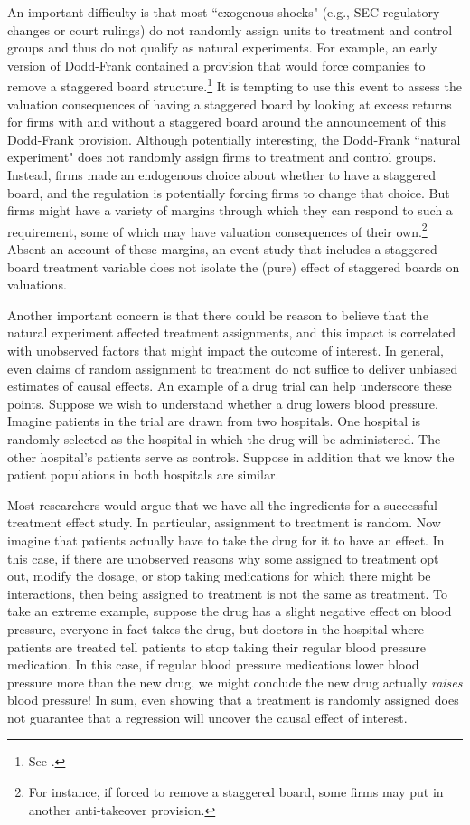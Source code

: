 \documentclass[12pt,reqno,titlepage]{amsart}
\theoremstyle{definition}
\begin{document}
\begin{doublespace}
An important difficulty is that most ``exogenous shocks" (e.g., SEC regulatory changes or court rulings) do not randomly assign 
units to treatment and control groups and thus do not qualify as natural experiments.
For example, an early version of Dodd-Frank contained a provision that would force companies to remove a staggered board structure.\footnote{See \citet{Larcker:2011hs}.}
It is tempting to use this event to assess the valuation consequences of having a staggered board by looking at excess returns for firms with and without a staggered board around the announcement of this Dodd-Frank provision.
Although potentially interesting, the Dodd-Frank ``natural experiment" does not randomly assign firms to treatment and control groups.  Instead, firms made an endogenous choice about whether to have a staggered board, and the regulation is potentially forcing firms to change that choice. 
But firms might have a variety of margins through which they can respond to such a requirement, some of which may have valuation consequences of their own.\footnote{For instance, if forced to remove a staggered board, some firms may put in another anti-takeover provision.}
Absent an account of these margins, an event study that includes a staggered board treatment variable does not isolate the (pure) effect of staggered boards on valuations. 

Another important concern is that there could be reason to believe that the natural experiment affected treatment assignments, and this impact is correlated with unobserved factors that might impact the outcome of interest. 
In general, even claims of random assignment to treatment do not suffice to deliver unbiased estimates of causal effects.
An example of a drug trial can help underscore these points. 
Suppose we wish to understand whether a drug lowers blood pressure.
Imagine patients in the trial are drawn from two hospitals.
One hospital is randomly selected as the hospital in which the drug will be administered. 
The other hospital's patients serve as controls. 
Suppose in addition that we know the patient populations in both hospitals are similar. 

Most researchers would argue that we have all the ingredients for a successful treatment effect study.
In particular, assignment to treatment is random.
Now imagine that patients actually have to take the drug for it to have an effect.
In this case, if there are unobserved reasons why some assigned to treatment opt out, modify the dosage, or stop taking medications for which there might be interactions, then being assigned to treatment is not the same as treatment. 
To take an extreme example, suppose the drug has a slight negative effect on blood pressure, everyone in fact takes the drug, but doctors in the hospital where patients are treated tell patients to stop taking their regular blood pressure medication. 
In this case, if regular blood pressure medications lower blood pressure more than the new drug, we might conclude the new drug actually \emph{raises} blood pressure! 
In sum, even showing that a treatment is randomly assigned does not guarantee that a regression will uncover the causal effect of interest. 


\end{doublespace}
\end{document}
